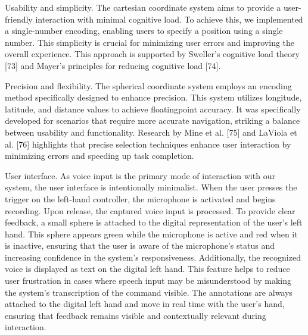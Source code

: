 \documentclass[preprint,12pt]{elsarticle}
\newcommand{\reftext}[1]{{\color{gray}#1}}   %
\begin{document}
\reftext{Usability and simplicity. The cartesian coordinate system aims to provide a user-friendly interaction with minimal cognitive load. To achieve this, we implemented a single-number encoding, enabling users to specify a position using a single number. This simplicity is crucial for minimizing user errors and improving the overall experience. This approach is supported by Sweller's cognitive load theory [73] and Mayer's principles for reducing cognitive load [74].}

\reftext{Precision and flexibility. The spherical coordinate system employs an encoding method specifically designed to enhance precision. This system utilizes longitude, latitude, and distance values to achieve floatingpoint accuracy. It was specifically developed for scenarios that require more accurate navigation, striking a balance between usability and functionality. Research by Mine et al. [75] and LaViola et al. [76] highlights that precise selection techniques enhance user interaction by minimizing errors and speeding up task completion.}

\reftext{User interface. As voice input is the primary mode of interaction with our system, the user interface is intentionally minimalist. When the user presses the trigger on the left-hand controller, the microphone is activated and begins recording. Upon release, the captured voice input is processed. To provide clear feedback, a small sphere is attached to the digital representation of the user's left hand. This sphere appears green while the microphone is active and red when it is inactive, ensuring that the user is aware of the microphone's status and increasing confidence in the system's responsiveness. Additionally, the recognized voice is displayed as text on the digital left hand. This feature helps to reduce user frustration in cases where speech input may be misunderstood by making the system's transcription of the command visible. The annotations are always attached to the digital left hand and move in real time with the user's hand, ensuring that feedback remains visible and contextually relevant during interaction.}
\end{document}
